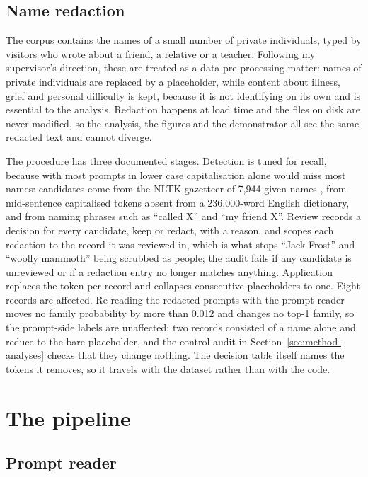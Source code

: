 \subsection{Name redaction}

The corpus contains the names of a small number of private individuals, typed by visitors who wrote about a friend, a relative or a teacher. Following my supervisor's direction, these are treated as a data pre-processing matter: names of private individuals are replaced by a placeholder, while content about illness, grief and personal difficulty is kept, because it is not identifying on its own and is essential to the analysis. Redaction happens at load time and the files on disk are never modified, so the analysis, the figures and the demonstrator all see the same redacted text and cannot diverge.

The procedure has three documented stages. Detection is tuned for recall, because with most prompts in lower case capitalisation alone would miss most names: candidates come from the NLTK gazetteer of 7,944 given names \cite{bird2009natural}, from mid-sentence capitalised tokens absent from a 236,000-word English dictionary, and from naming phrases such as ``called X'' and ``my friend X''. Review records a decision for every candidate, keep or redact, with a reason, and scopes each redaction to the record it was reviewed in, which is what stops ``Jack Frost'' and ``woolly mammoth'' being scrubbed as people; the audit fails if any candidate is unreviewed or if a redaction entry no longer matches anything. Application replaces the token per record and collapses consecutive placeholders to one. Eight records are affected. Re-reading the redacted prompts with the prompt reader moves no family probability by more than 0.012 and changes no top-1 family, so the prompt-side labels are unaffected; two records consisted of a name alone and reduce to the bare placeholder, and the control audit in Section~\ref{sec:method-analyses} checks that they change nothing. The decision table itself names the tokens it removes, so it travels with the dataset rather than with the code.

\section{The pipeline}
\label{sec:method-pipeline}

\subsection{Prompt reader}

